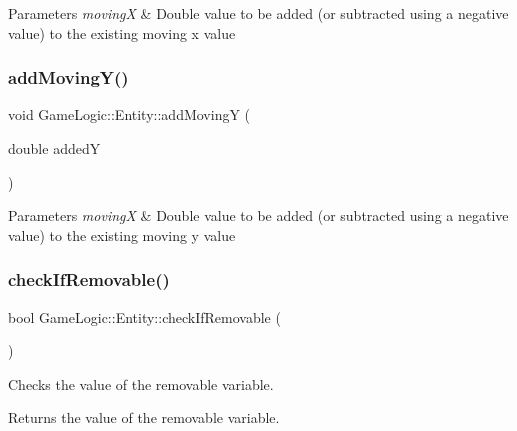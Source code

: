 \begin{DoxyParams}{Parameters}
{\em movingX} & Double value to be added (or subtracted using a negative value) to the existing moving x value \\
\hline
\end{DoxyParams}
\mbox{\label{classGameLogic_1_1Entity_ad46302e582b23b71e250f15c47f59ee0}} 
\subsubsection{\texorpdfstring{add\+Moving\+Y()}{addMovingY()}}
{\footnotesize\ttfamily void Game\+Logic\+::\+Entity\+::add\+MovingY (\begin{DoxyParamCaption}\item[{double}]{addedY }\end{DoxyParamCaption})}


\begin{DoxyParams}{Parameters}
{\em movingX} & Double value to be added (or subtracted using a negative value) to the existing moving y value \\
\hline
\end{DoxyParams}
\mbox{\label{classGameLogic_1_1Entity_ac1521f845aac18a02bc8a2434579919e}} 
\subsubsection{\texorpdfstring{check\+If\+Removable()}{checkIfRemovable()}}
{\footnotesize\ttfamily bool Game\+Logic\+::\+Entity\+::check\+If\+Removable (\begin{DoxyParamCaption}{ }\end{DoxyParamCaption})}

Checks the value of the removable variable. \begin{DoxyReturn}{Returns}
the value of the removable variable. 
\end{DoxyReturn}
\mbox{\label{classGameLogic_1_1Entity_adf23a7036cb99dfc6e33434018131da4}} 
